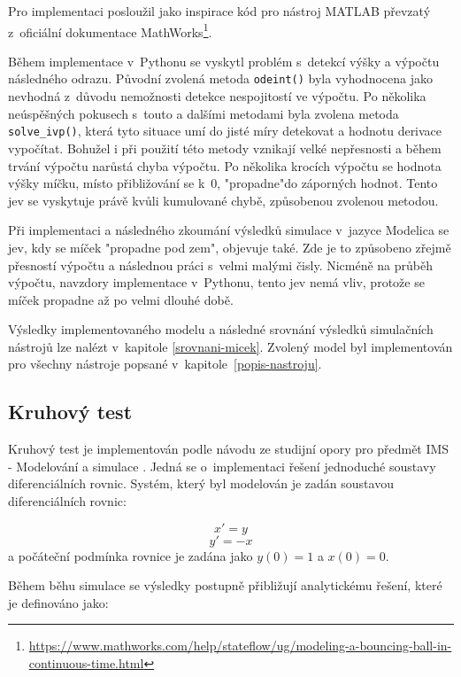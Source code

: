 Pro implementaci posloužil jako inspirace kód pro nástroj MATLAB převzatý z~oficiální dokumentace MathWorks\footnote{\url{https://www.mathworks.com/help/stateflow/ug/modeling-a-bouncing-ball-in-continuous-time.html}}. 

Během implementace v~Pythonu se vyskytl problém s~detekcí výšky a výpočtu následného odrazu. Původní zvolená metoda \texttt{odeint()} byla vyhodnocena jako nevhodná z~důvodu nemožnosti detekce nespojitostí ve výpočtu. Po několika neúspěšných pokusech s~touto a dalšími metodami byla zvolena metoda \texttt{solve\_ivp()}, která tyto situace umí do jisté míry detekovat a hodnotu derivace vypočítat. Bohužel i při použití této metody vznikají velké nepřesnosti a během trvání výpočtu narůstá chyba výpočtu. Po několika krocích výpočtu se hodnota výšky míčku, místo přibližování se k~0, "propadne"\space do záporných hodnot. Tento jev se vyskytuje právě kvůli kumulované chybě, způsobenou zvolenou metodou.

Při implementaci a následného zkoumání výsledků simulace v~jazyce Modelica se jev, kdy se míček "propadne pod zem", objevuje také. Zde je to způsobeno zřejmě přesností výpočtu a následnou práci s~velmi malými čisly. Nicméně na průběh výpočtu, navzdory implementace v~Pythonu, tento jev nemá vliv, protože se míček propadne až po velmi dlouhé době.

Výsledky implementovaného modelu a následné srovnání výsledků simulačních nástrojů lze nalézt v~kapitole \ref{srovnani-micek}.
Zvolený model byl implementován pro všechny nástroje popsané v~kapitole~\ref{popis-nastroju}.

\subsection*{Kruhový test}
\label{kruhovy-test}

Kruhový test je implementován podle návodu ze studijní opory pro předmět IMS - Modelování a simulace \cite{IMS-skripta}. Jedná se o~implementaci řešení jednoduché soustavy diferenciálních rovnic. Systém, který byl modelován je zadán soustavou diferenciálních rovnic:

\begin{equation}
   x' = y
\end{equation}
\begin{equation}
    y' = -x
\end{equation}
a počáteční podmínka rovnice je zadána jako $y(0) = 1$ a $x(0) = 0$.

Během běhu simulace se výsledky postupně přibližují analytickému řešení, které je definováno jako:

